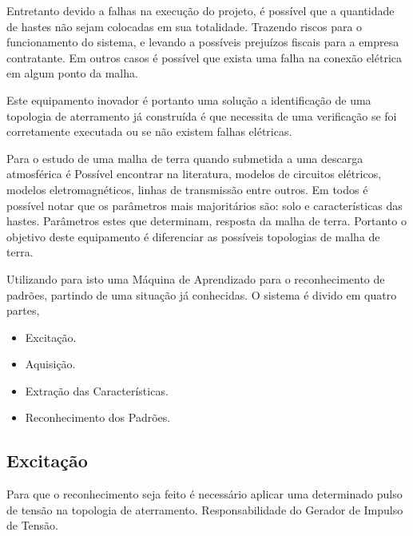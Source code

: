 \documentclass[a4paper, 10pt]{article}
\begin{document}
Entretanto devido a falhas na execução do projeto, é possível que a quantidade
de hastes não sejam colocadas em sua totalidade. Trazendo riscos para o 
funcionamento do sistema, e levando a possíveis prejuízos fiscais para a 
empresa contratante. Em outros casos é possível que exista uma falha na 
conexão elétrica em algum ponto da malha.

Este equipamento inovador é portanto uma solução a identificação de uma topologia
de aterramento já construída é que necessita de uma verificação se foi corretamente
executada ou se não existem falhas elétricas.

Para o estudo de uma malha de terra quando submetida a uma descarga atmosférica 
é Possível encontrar na literatura, modelos de circuitos elétricos, modelos 
eletromagnéticos, linhas de transmissão entre outros. Em todos é possível notar 
que os parâmetros mais majoritários são: solo e características das hastes. 
Parâmetros estes que determinam, resposta da malha de terra. Portanto o objetivo
deste equipamento é diferenciar as possíveis topologias de malha de terra. 

Utilizando para isto uma Máquina de Aprendizado para o reconhecimento de padrões, 
partindo de uma situação já conhecidas. O sistema é divido em quatro partes, 

\begin{itemize}
    \item Excitação.
    \item Aquisição.
    \item Extração das Características.
    \item Reconhecimento dos Padrões.
\end{itemize}

\subsection{Excitação}

Para que o reconhecimento seja feito é necessário aplicar uma determinado pulso
de tensão na topologia de aterramento. Responsabilidade do Gerador de Impulso
de Tensão. 
\end{document}
